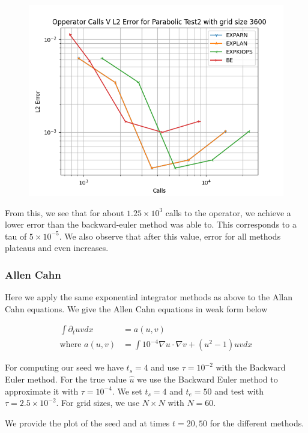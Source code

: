 \documentclass{article}
\begin{document}
\begin{figure}[H]
	  \includegraphics[width=\linewidth]{FEMethodPlots/Operator Calls V Error for Parabolic Test2 with grid size 3600.png}
\end{figure}

From this, we see that for about $1.25\times 10^{3}$ calls to the operator, we achieve a lower error than the backward-euler method was able to.
This corresponds to a tau of $ 5\times 10^{-5}$.
We also observe that after this value, error for all methods plateaus and even increases.

\subsubsection{Allen Cahn}
Here we apply the same exponential integrator methods as above to the Allan Cahn equations.
We give the Allen Cahn equations in weak form below

\begin{align*}
\int \partial_tu v dx &= a(u,v)\\
\text {where } a(u,v) &= \int 10^{-4} \nabla u \cdot \nabla v + (u^2-1)uv dx
\end{align*}

For computing our seed we have $t_s = 4$ and use $\tau = 10^{-2}$ with the Backward Euler method.
For the true value $\hat u$ we use the Backward Euler method to approximate it with $\tau = 10^{-4}$.
We set $t_s = 4$ and $t_e = 50$ and test with $\tau = 2.5\times 10^{-2}$.
For grid sizes, we use $N\times N$ with $N = 60$.


We provide the plot of the seed and at times $t = 20, 50$ for the different methods. 
\end{document}

